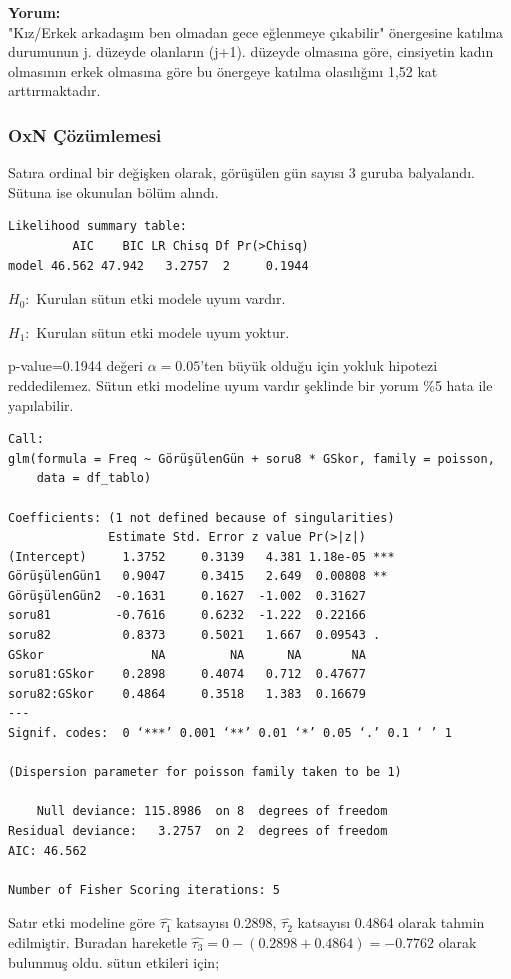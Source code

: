 \documentclass{article}
\begin{document}
\textbf{Yorum:} \\
"Kız/Erkek arkadaşım ben olmadan gece eğlenmeye çıkabilir" önergesine katılma durumunun j. düzeyde olanların (j+1). düzeyde olmasına göre, cinsiyetin kadın olmasının erkek olmasına göre bu önergeye katılma olasılığını 1,52 kat arttırmaktadır.

\subsubsection{OxN Çözümlemesi}
Satıra ordinal bir değişken olarak, görüşülen gün sayısı 3 guruba balyalandı. Sütuna ise okunulan bölüm alındı.

\begin{verbatim}
Likelihood summary table:
         AIC    BIC LR Chisq Df Pr(>Chisq)
model 46.562 47.942   3.2757  2     0.1944
\end{verbatim}

$H_0:$ Kurulan sütun etki modele uyum vardır.

$H_1:$ Kurulan sütun etki modele uyum yoktur.  

\vspace{10pt}
p-value=0.1944 değeri $\alpha=0.05$'ten büyük olduğu için yokluk hipotezi reddedilemez. Sütun etki modeline uyum vardır şeklinde bir yorum \%5 hata ile yapılabilir.

\begin{verbatim}
Call:
glm(formula = Freq ~ GörüşülenGün + soru8 * GSkor, family = poisson, 
    data = df_tablo)

Coefficients: (1 not defined because of singularities)
              Estimate Std. Error z value Pr(>|z|)    
(Intercept)     1.3752     0.3139   4.381 1.18e-05 ***
GörüşülenGün1   0.9047     0.3415   2.649  0.00808 ** 
GörüşülenGün2  -0.1631     0.1627  -1.002  0.31627    
soru81         -0.7616     0.6232  -1.222  0.22166    
soru82          0.8373     0.5021   1.667  0.09543 .  
GSkor               NA         NA      NA       NA    
soru81:GSkor    0.2898     0.4074   0.712  0.47677    
soru82:GSkor    0.4864     0.3518   1.383  0.16679    
---
Signif. codes:  0 ‘***’ 0.001 ‘**’ 0.01 ‘*’ 0.05 ‘.’ 0.1 ‘ ’ 1

(Dispersion parameter for poisson family taken to be 1)

    Null deviance: 115.8986  on 8  degrees of freedom
Residual deviance:   3.2757  on 2  degrees of freedom
AIC: 46.562

Number of Fisher Scoring iterations: 5
\end{verbatim}
Satır etki modeline göre $\hat{\tau_1}$ katsayısı 0.2898, $\hat{\tau_2}$ katsayısı 0.4864 olarak tahmin edilmiştir. Buradan hareketle $\hat{\tau_3}=0-(0.2898+0.4864) = -0.7762$ olarak bulunmuş oldu. sütun etkileri için;
\end{document}
